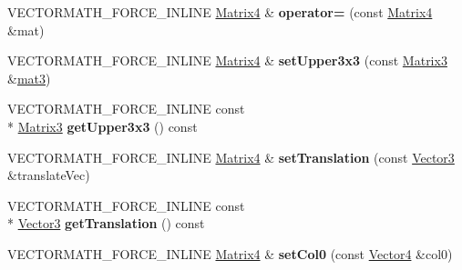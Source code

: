 \begin{DoxyCompactItemize}
\item 
\hypertarget{class_vectormath_1_1_aos_1_1_matrix4_a267c74e0e3314b54ae0494c8de619736}{V\+E\+C\+T\+O\+R\+M\+A\+T\+H\+\_\+\+F\+O\+R\+C\+E\+\_\+\+I\+N\+L\+I\+N\+E \hyperlink{class_vectormath_1_1_aos_1_1_matrix4}{Matrix4} \& {\bfseries operator=} (const \hyperlink{class_vectormath_1_1_aos_1_1_matrix4}{Matrix4} \&mat)}\label{class_vectormath_1_1_aos_1_1_matrix4_a267c74e0e3314b54ae0494c8de619736}

\item 
\hypertarget{class_vectormath_1_1_aos_1_1_matrix4_ac8290f5943fc0500bb973deabbb73763}{V\+E\+C\+T\+O\+R\+M\+A\+T\+H\+\_\+\+F\+O\+R\+C\+E\+\_\+\+I\+N\+L\+I\+N\+E \hyperlink{class_vectormath_1_1_aos_1_1_matrix4}{Matrix4} \& {\bfseries set\+Upper3x3} (const \hyperlink{class_vectormath_1_1_aos_1_1_matrix3}{Matrix3} \&\hyperlink{classmat3}{mat3})}\label{class_vectormath_1_1_aos_1_1_matrix4_ac8290f5943fc0500bb973deabbb73763}

\item 
\hypertarget{class_vectormath_1_1_aos_1_1_matrix4_a9ee79e18911c8fb5dbeeacf1c24058af}{V\+E\+C\+T\+O\+R\+M\+A\+T\+H\+\_\+\+F\+O\+R\+C\+E\+\_\+\+I\+N\+L\+I\+N\+E const \\*
\hyperlink{class_vectormath_1_1_aos_1_1_matrix3}{Matrix3} {\bfseries get\+Upper3x3} () const }\label{class_vectormath_1_1_aos_1_1_matrix4_a9ee79e18911c8fb5dbeeacf1c24058af}

\item 
\hypertarget{class_vectormath_1_1_aos_1_1_matrix4_afb83fc4a106bfdb32230e64e9375b35f}{V\+E\+C\+T\+O\+R\+M\+A\+T\+H\+\_\+\+F\+O\+R\+C\+E\+\_\+\+I\+N\+L\+I\+N\+E \hyperlink{class_vectormath_1_1_aos_1_1_matrix4}{Matrix4} \& {\bfseries set\+Translation} (const \hyperlink{class_vectormath_1_1_aos_1_1_vector3}{Vector3} \&translate\+Vec)}\label{class_vectormath_1_1_aos_1_1_matrix4_afb83fc4a106bfdb32230e64e9375b35f}

\item 
\hypertarget{class_vectormath_1_1_aos_1_1_matrix4_a5740afa4f7137489b35c9f397709d81b}{V\+E\+C\+T\+O\+R\+M\+A\+T\+H\+\_\+\+F\+O\+R\+C\+E\+\_\+\+I\+N\+L\+I\+N\+E const \\*
\hyperlink{class_vectormath_1_1_aos_1_1_vector3}{Vector3} {\bfseries get\+Translation} () const }\label{class_vectormath_1_1_aos_1_1_matrix4_a5740afa4f7137489b35c9f397709d81b}

\item 
\hypertarget{class_vectormath_1_1_aos_1_1_matrix4_add6600aae59dfa0cd9bd58f2fe27d7c3}{V\+E\+C\+T\+O\+R\+M\+A\+T\+H\+\_\+\+F\+O\+R\+C\+E\+\_\+\+I\+N\+L\+I\+N\+E \hyperlink{class_vectormath_1_1_aos_1_1_matrix4}{Matrix4} \& {\bfseries set\+Col0} (const \hyperlink{class_vectormath_1_1_aos_1_1_vector4}{Vector4} \&col0)}\label{class_vectormath_1_1_aos_1_1_matrix4_add6600aae59dfa0cd9bd58f2fe27d7c3}


\end{DoxyCompactItemize}
